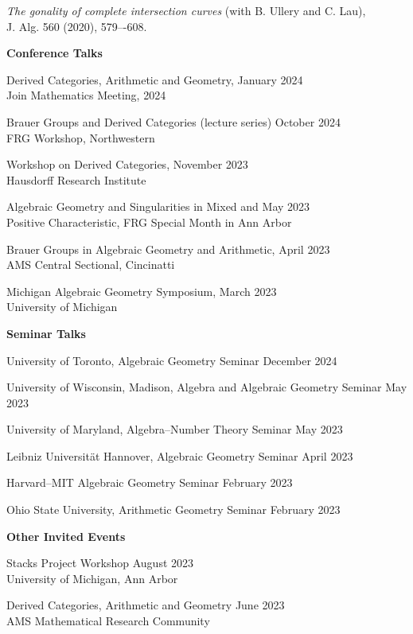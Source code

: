 \documentclass[11 pt]{letter}
\begin{document}
	\emph{The gonality of complete intersection curves} (with B. Ullery and C. Lau), \\
	\indent J. Alg. 560 (2020), 579–-608.


	\medskip
	\noindent
	\textbf{\large{Conference Talks}}

	Derived Categories, Arithmetic and Geometry, \hfill January 2024 \\
	\indent Join Mathematics Meeting, 2024

	Brauer Groups and Derived Categories (lecture series) \hfill October 2024 \\
	\indent FRG Workshop, Northwestern

	
	Workshop on Derived Categories, \hfill November 2023 \\
	\indent Hausdorff Research Institute

	Algebraic Geometry and Singularities in Mixed and \hfill May 2023 \\
	\indent Positive Characteristic, FRG Special Month in Ann Arbor 


	Brauer Groups in Algebraic Geometry and Arithmetic, \hfill April 2023 \\
	\indent AMS Central Sectional, Cincinatti 


	Michigan Algebraic Geometry Symposium, \hfill March 2023 \\
	\indent University of Michigan


	\medskip
	\noindent
	\textbf{\large{Seminar Talks}}

	University of Toronto, Algebraic Geometry Seminar \hfill December 2024

	University of Wisconsin, Madison, Algebra and Algebraic Geometry Seminar \hfill May 2023

	University of Maryland, Algebra--Number Theory Seminar \hfill May 2023

	Leibniz Universit\"at Hannover, Algebraic Geometry Seminar \hfill April 2023

	Harvard--MIT Algebraic Geometry Seminar \hfill February 2023

	Ohio State University, Arithmetic Geometry Seminar \hfill February 2023



	\medskip
	\noindent
	\textbf{Other Invited Events}

	Stacks Project Workshop \hfill August 2023 \\
	\indent University of Michigan, Ann Arbor 

	Derived Categories, Arithmetic and Geometry \hfill June 2023 \\
	\indent AMS Mathematical Research Community 
\end{document}
